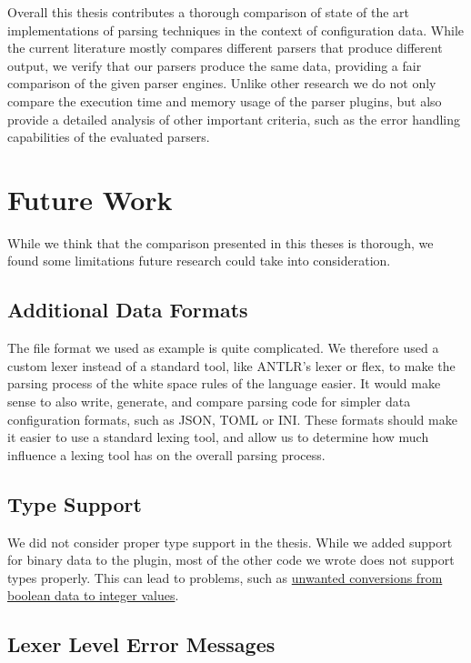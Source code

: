Overall this thesis contributes a thorough comparison of state of the art implementations of parsing techniques in the context of configuration data. While the current literature mostly compares different parsers that produce different output, we verify that our parsers produce the same data, providing a fair comparison of the given parser engines. Unlike other research we do not only compare the execution time and memory usage of the parser plugins, but also provide a detailed analysis of other important criteria, such as the error handling capabilities of the evaluated parsers.

\section{Future Work}

While we think that the comparison presented in this theses is thorough, we found some limitations future research could take into consideration.

\subsection{Additional Data Formats}

The  file format we used as example is quite complicated. We therefore used a custom lexer instead of a standard tool, like ANTLR’s lexer or flex, to make the parsing process of the white space rules of the language easier. It would make sense to also write, generate, and compare parsing code for simpler data configuration formats, such as \gls{JSON}, TOML or INI. These formats should make it easier to use a standard lexing tool, and allow us to determine how much influence a lexing tool has on the overall parsing process.

\subsection{Type Support}

We did not consider proper type support in the thesis. While we added support for binary data to the \LinkYAMLCPP{} plugin, most of the other code we wrote does not support types properly. This can lead to problems, such as \href{https://issues.libelektra.org/2833}{unwanted conversions from boolean data to integer values}.

\subsection{Lexer Level Error Messages}

